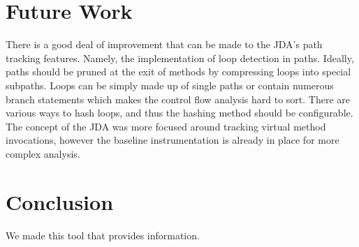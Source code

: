 \documentclass[conference,10pt,twocolumn]{./IEEE/IEEEtran}
\begin{document}
\section{Future Work}
There is a good deal of improvement that can be made to the JDA’s path tracking features.
Namely, the implementation of loop detection in paths.  
Ideally, paths should be pruned at the exit of methods by compressing loops into special subpaths.  
Loops can be simply made up of single paths or contain numerous branch statements which makes the control flow analysis hard to sort.  
There are various ways to hash loops, and thus the hashing method should be configurable.  
The concept of the JDA was more focused around tracking virtual method invocations, however the baseline instrumentation is already in place for more complex analysis.

\section{Conclusion}
We made this tool that provides information.



\end{document}
